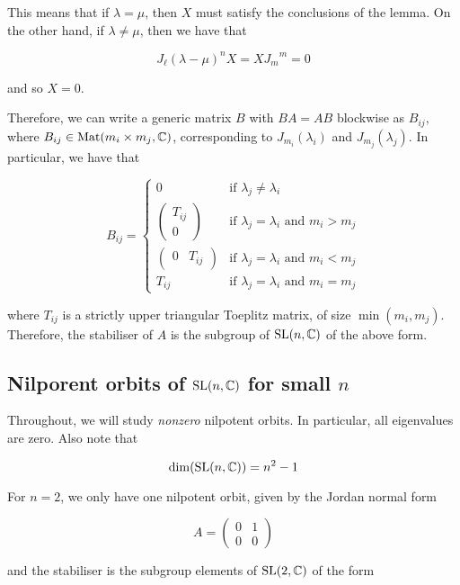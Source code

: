 \documentclass{article}
\begin{document}
This means that if \(\lambda = \mu\), then \(X\) must satisfy the conclusions of the lemma. On the other hand, if \(\lambda \ne \mu\), then we have that

\[J_\ell(\lambda - \mu)^n X = X{J_m}^m = 0\]

and so \(X = 0\).

Therefore, we can write a generic matrix \(B\) with \(BA = AB\) blockwise as \(B_{ij}\), where \(B_{ij} \in \operatorname{Mat}(m_i \times m_j, \mathbb{C})\), corresponding to \(J_{m_i}(\lambda_i)\) and \(J_{m_j}(\lambda_j)\). In particular, we have that

\[B_{ij} = \begin{cases}
    0 & \text{if }\lambda_j \ne \lambda_i \\
    \begin{pmatrix}
        T_{ij} \\ 0
    \end{pmatrix} & \text{if } \lambda_j = \lambda_i \text{ and } m_i > m_j \\
    \begin{pmatrix}
        0 & T_{ij}
    \end{pmatrix} & \text{if } \lambda_j = \lambda_i \text{ and } m_i < m_j \\
    T_{ij} & \text{if } \lambda_j = \lambda_i \text{ and } m_i = m_j
\end{cases}\]

where \(T_{ij}\) is a strictly upper triangular Toeplitz matrix, of size \(\min(m_i, m_j)\). Therefore, the stabiliser of \(A\) is the subgroup of \(\operatorname{SL}(n, \mathbb{C})\) of the above form.

\subsection{Nilporent orbits of \(\operatorname{SL}(n, \mathbb{C})\) for small \(n\)}

Throughout, we will study \emph{nonzero} nilpotent orbits. In particular, all eigenvalues are zero. Also note that

\[\dim(\operatorname{SL}(n, \mathbb{C})) = n^2 - 1\]

For \(n = 2\), we only have one nilpotent orbit, given by the Jordan normal form

\[A = \begin{pmatrix}
    0 & 1 \\ 0 & 0
\end{pmatrix}\]

and the stabiliser is the subgroup elements of \(\operatorname{SL}(2, \mathbb{C})\) of the form
\end{document}
